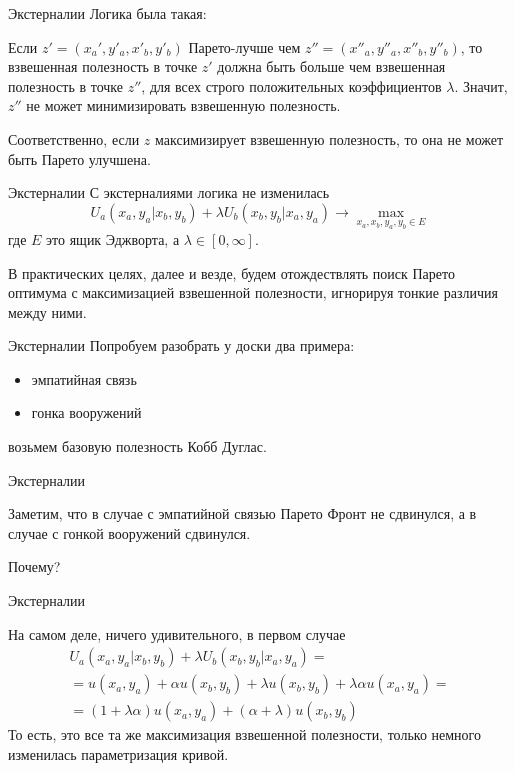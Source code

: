 \documentclass{beamer}
\begin{document}
\begin{frame}{Экстерналии}
Логика была такая: 

Если $z' = (x_a',y'_a,x'_b,y'_b)$ Парето-лучше чем $z'' = (x''_a,y''_a,x''_b,y''_b)$, то взвешенная полезность в точке $z'$ должна быть больше чем взвешенная полезность в точке $z''$, для всех строго положительных коэффициентов $\lambda$. Значит, $z''$ не может минимизировать взвешенную полезность.

Соответственно, если $z$ максимизирует взвешенную полезность, то она не может быть Парето улучшена.
\end{frame}

\begin{frame}{Экстерналии}
С экстерналиями логика не изменилась
$$ U_a(x_a, y_a|x_b, y_b) + \lambda U_b(x_b,y_b| x_a, y_a) \to \max_{x_a,x_b,y_a,y_b \in E}$$
где $E$ это ящик Эджворта, а $\lambda \in [0, \infty]$. 

В практических целях, далее и везде, \alert{будем отождествлять поиск Парето оптимума с максимизацией взвешенной полезности}, игнорируя тонкие различия между ними.
\end{frame}

\begin{frame}{Экстерналии}
Попробуем разобрать у доски два примера:
\begin{itemize}
  \item эмпатийная связь
  \item гонка вооружений
\end{itemize}
возьмем базовую полезность Кобб Дуглас.
\end{frame}

\begin{frame}{Экстерналии}

Заметим, что в случае с эмпатийной связью Парето Фронт не сдвинулся, а в случае с гонкой вооружений сдвинулся. 

Почему?

\end{frame}

\begin{frame}{Экстерналии}

На самом деле, ничего удивительного, в первом случае
\begin{gather*}
U_a(x_a, y_a|x_b, y_b) + \lambda U_b(x_b, y_b|x_a, y_a) = \\ =
u(x_a, y_a) + \alpha u(x_b, y_b) + \lambda u(x_b,y_b) + \lambda \alpha u(x_a, y_a) = \\ = (1+\lambda \alpha) u(x_a, y_a) + (\alpha + \lambda) u(x_b, y_b)\end{gather*}
То есть, это все та же максимизация взвешенной полезности, только немного изменилась параметризация кривой.

\end{frame}
\end{document}
